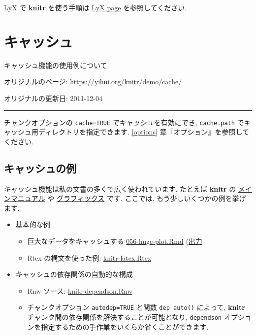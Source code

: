 \documentclass[
  lualatex,ja=standard,jafont=noto-otf]{bxjsreport}
\providecommand{\tightlist}{%
  \setlength{\itemsep}{0pt}\setlength{\parskip}{0pt}}
\begin{document}
LyX で \textbf{knitr} を使う手順は
\href{https://yihui.org/knitr/demo/lyx/}{LyX page} を参照してください.

\hypertarget{cache}{%
\chapter*{キャッシュ}\label{cache}}

キャッシュ機能の使用例について

オリジナルのページ: \url{https://yihui.org/knitr/demo/cache/}

オリジナルの更新日: 2011-12-04

\begin{center}\rule{0.5\linewidth}{0.5pt}\end{center}

チャンクオプションの \texttt{cache=TRUE} でキャッシュを有効にでき,
\texttt{cache.path} でキャッシュ用ディレクトリを指定できます.
\ref{options} 章『オプション』を参照してください.

\hypertarget{ux30adux30e3ux30c3ux30b7ux30e5ux306eux4f8b}{%
\section*{キャッシュの例}\label{ux30adux30e3ux30c3ux30b7ux30e5ux306eux4f8b}}

キャッシュ機能は私の文書の多くで広く使われています. たとえば
\textbf{knitr} の \protect\hyperlink{manual}{メインマニュアル} や
\protect\hyperlink{graphics}{グラフィックス} です. ここでは,
もう少しいくつかの例を挙げます.

\begin{itemize}
\tightlist
\item
  基本的な例

  \begin{itemize}
  \tightlist
  \item
    巨大なデータをキャッシュする
    \href{https://github.com/yihui/knitr-examples/raw/master/056-huge-plot.Rmd}{056-huge-plot.Rmd}
    (\href{https://github.com/yihui/knitr-examples/blob/master/056-huge-plot.md}{出力}
  \item
    Rtex の構文を使った例:
    \href{https://github.com/yihui/knitr/blob/master/inst/examples/knitr-latex.Rtex}{knitr-latex.Rtex}
  \end{itemize}
\item
  キャッシュの依存関係の自動的な構成

  \begin{itemize}
  \tightlist
  \item
    Rnw ソース:
    \href{https://github.com/yihui/knitr-examples/blob/master/017-auto-dependson.Rnw}{knitr-dependson.Rnw}
  \item
    チャンクオプション \texttt{autodep=TRUE} と関数 \texttt{dep\_auto()}
    によって, \textbf{knitr}
    チャンク間の依存関係を解決することが可能となり, \texttt{dependson}
    オプションを指定するための手作業をいくらか省くことができます.
  \end{itemize}
\end{itemize}
\end{document}
